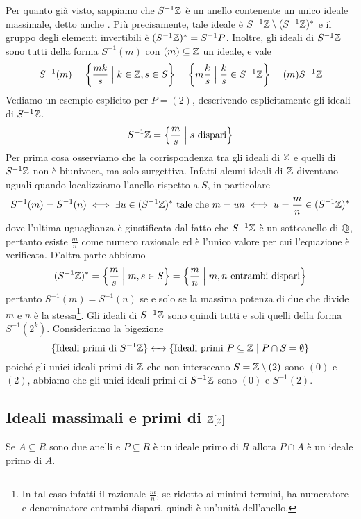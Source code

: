 \documentclass[11pt]{scrartcl}
\begin{document}
Per quanto già visto, sappiamo che $S^{-1}\mathbb Z$ è un anello contenente
un unico ideale massimale, detto anche . Più precisamente,
tale ideale è $S^{-1}\mathbb Z \setminus (S^{-1}\mathbb Z)^*$ e il gruppo degli elementi
invertibili è $(S^{-1}\mathbb Z)^* = S^{-1}P$. Inoltre, gli ideali di $S^{-1}\mathbb Z$
sono tutti della forma $S^{-1}(m)$ con $(m)\subseteq \mathbb Z$ un ideale, e vale 
\[
    S^{-1}(m) = \left\{\frac{mk}{s} \Bigm|k \in \mathbb Z, s \in S\right\} = 
    \left\{m\frac k s\Bigm| \frac k s \in S^{-1}\mathbb Z\right\} = (m)S^{-1}\mathbb Z
\]
Vediamo un esempio esplicito per $P = (2)$, descrivendo esplicitamente gli 
ideali di $S^{-1}\mathbb Z$. 
\[
    S^{-1}\mathbb Z = \left\{\frac m s \Bigm| s \text{ dispari}\right\}
\]
Per prima cosa osserviamo che la corrispondenza tra 
gli ideali di $\mathbb Z$ e quelli di $S^{-1}\mathbb Z$ non è biunivoca, ma solo surgettiva.
Infatti alcuni ideali di $\mathbb Z$ diventano uguali quando localizziamo l'anello
rispetto a $S$, in particolare
\[
    S^{-1}(m) = S^{-1}(n) \iff \exists u \in (S^{-1}\mathbb Z)^* \text{ tale che }
    m = un \iff u = \frac m n \in (S^{-1}\mathbb Z)^*
\]
dove l'ultima uguaglianza è giustificata dal fatto che $S^{-1}\mathbb Z$ è un 
sottoanello di $\mathbb Q$, pertanto esiste $\displaystyle\frac m n$ come numero
razionale ed è l'unico valore per cui l'equazione è verificata. D'altra parte
abbiamo 
\[
    (S^{-1}\mathbb Z)^* = \left\{\frac m s \Bigm| m, s \in S\right\} = 
    \left\{\frac m n \Bigm| m, n\text{ entrambi dispari}\right\}
\]
pertanto $S^{-1}(m) = S^{-1}(n)$ se e solo se la massima potenza di due che 
divide $m$ e $n$ è la stessa\footnote{
    In tal caso infatti il razionale $\frac m n$, se ridotto ai 
    minimi termini, ha numeratore e denominatore entrambi dispari, quindi
    è un'unità dell'anello.
}.
Gli ideali di $S^{-1}\mathbb Z$ sono quindi tutti e soli quelli della forma $S^{-1}(2^k)$.
Consideriamo la bigezione
\[
    \{\text{Ideali primi di }S^{-1}\mathbb Z\}\leftarrow\mathrel{\mkern-7mu}\rightarrow 
    \{\text{Ideali primi } P\subseteq \mathbb Z \mid P\cap S = \emptyset\}
\]
poiché gli unici ideali primi di $\mathbb Z$ che non intersecano $S = \mathbb Z\setminus(2)$
sono $(0)$ e $(2)$, abbiamo che gli unici ideali primi di $S^{-1}\mathbb Z$ sono
$(0)$ e $S^{-1}(2)$.

\newpage

\subsection{Ideali massimali e primi di $\mathbb Z[x]$}

\begin{lemma}
    \label{lemma2.3}
    Se $A \subseteq R$ sono due anelli e $P \subseteq R$ è un ideale primo
    di $R$ allora $P\cap A$ è un ideale primo di $A$.
\end{lemma}
\end{document}
